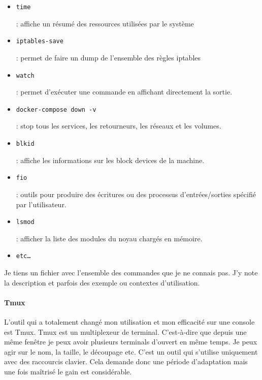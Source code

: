 \documentclass[12pt]{article}
\begin{document}
\begin{itemize}
    \item \begin{code}\texttt{time}\end{code}: affiche un résumé des ressources utilisées par le système
    \item \begin{code}\texttt{iptables-save}\end{code}: permet de faire un dump de l'ensemble des règles iptables
    \item \begin{code}\texttt{watch}\end{code}: permet d'exécuter une commande en affichant directement la sortie.
    \item \begin{code}\texttt{docker-compose down -v}\end{code}: stop tous les services, les retourneurs, les réseaux et les volumes.
    \item \begin{code}\texttt{blkid}\end{code}: affiche les informations sur les block devices de la machine.
    \item \begin{code}\texttt{fio}\end{code}: outils pour produire des écritures ou des processus d'entrées/sorties spécifié par l'utilisateur.
    \item \begin{code}\texttt{lsmod}\end{code}: afficher la liste des modules du noyau chargés en mémoire. 
    \item \begin{code}\texttt{etc\dots}\end{code}
\end{itemize}

Je tiens un fichier avec l'ensemble des commandes que je ne connais pas.
J'y note la description et parfois des exemple ou contextes d'utilisation.


\paragraph{Tmux}
L'outil qui a totalement changé mon utilisation et mon efficacité sur une console est Tmux.
Tmux est un multiplexeur de terminal.
C'est-à-dire que depuis une même fenêtre je peux avoir plusieurs terminals d'ouvert en même temps.
Je peux agir sur le nom, la taille, le découpage etc.
C'est un outil qui s'utilise uniquement avec des raccourcis clavier.
Cela demande donc une période d'adaptation mais une fois maîtrisé le gain est considérable.
\end{document}
